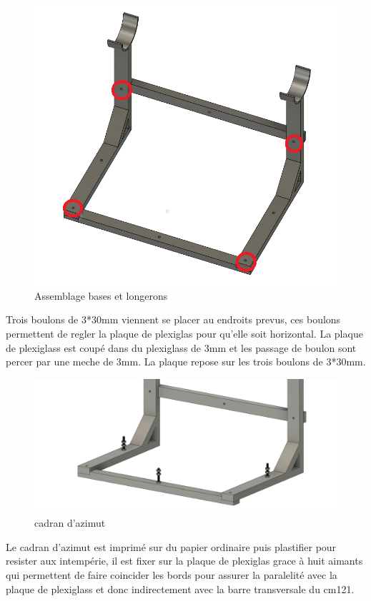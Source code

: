 \documentclass[12pt,a4paper]{article}
\begin{document}
\begin{flushleft}
\begin{figure}[H]
\centering
\includegraphics[width=12cm]{image/montage/boussole_solaire/2.png} 
\caption{Assemblage bases et longerons}
\end{figure}

Trois boulons de 3*30mm viennent se placer au endroits prevus, ces boulons permettent de regler la plaque de plexiglas pour qu'elle soit horizontal. La plaque de plexiglass est coupé dans du plexiglass de 3mm et les passage de boulon sont percer par une meche de 3mm. La plaque repose sur les trois boulons de 3*30mm.\\

\begin{figure}[H]
\centering
\includegraphics[width=12cm]{image/montage/boussole_solaire/6.png} 
\caption{cadran d'azimut}
\end{figure}

Le cadran d'azimut est imprimé sur du papier ordinaire puis plastifier pour resister aux intempérie, il est fixer sur la plaque de plexiglas grace à huit aimants qui permettent de faire coincider les bords pour assurer la paralelité avec la plaque de plexiglass et donc indirectement avec la barre transversale du cm121.\\


\end{flushleft}
\end{document}
